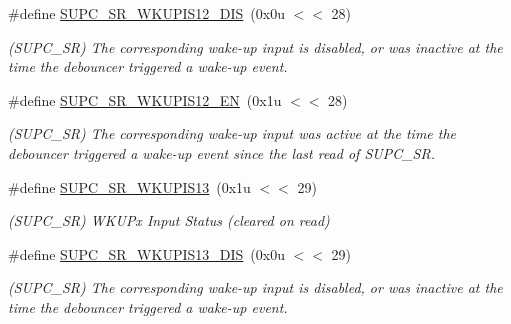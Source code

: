 \begin{DoxyCompactItemize}
\#define \mbox{\hyperlink{group__SAMV71__SUPC_ga8d50ae6062fac5694ae093e8dfc63894}{S\+U\+P\+C\+\_\+\+S\+R\+\_\+\+W\+K\+U\+P\+I\+S12\+\_\+\+D\+IS}}~(0x0u $<$$<$ 28)
\begin{DoxyCompactList}\small\item\em (S\+U\+P\+C\+\_\+\+SR) The corresponding wake-\/up input is disabled, or was inactive at the time the debouncer triggered a wake-\/up event. \end{DoxyCompactList}\item 
\mbox{\label{group__SAMV71__SUPC_ga88926dd1474bacfe6d4f9d31a5ecd487}} 
\#define \mbox{\hyperlink{group__SAMV71__SUPC_ga88926dd1474bacfe6d4f9d31a5ecd487}{S\+U\+P\+C\+\_\+\+S\+R\+\_\+\+W\+K\+U\+P\+I\+S12\+\_\+\+EN}}~(0x1u $<$$<$ 28)
\begin{DoxyCompactList}\small\item\em (S\+U\+P\+C\+\_\+\+SR) The corresponding wake-\/up input was active at the time the debouncer triggered a wake-\/up event since the last read of S\+U\+P\+C\+\_\+\+SR. \end{DoxyCompactList}\item 
\mbox{\label{group__SAMV71__SUPC_gac72338e58315c3ef88f7a9328533328e}} 
\#define \mbox{\hyperlink{group__SAMV71__SUPC_gac72338e58315c3ef88f7a9328533328e}{S\+U\+P\+C\+\_\+\+S\+R\+\_\+\+W\+K\+U\+P\+I\+S13}}~(0x1u $<$$<$ 29)
\begin{DoxyCompactList}\small\item\em (S\+U\+P\+C\+\_\+\+SR) W\+K\+U\+Px Input Status (cleared on read) \end{DoxyCompactList}\item 
\mbox{\label{group__SAMV71__SUPC_gaba99fb2dc63dc1fcd2c4a421437a0fbc}} 
\#define \mbox{\hyperlink{group__SAMV71__SUPC_gaba99fb2dc63dc1fcd2c4a421437a0fbc}{S\+U\+P\+C\+\_\+\+S\+R\+\_\+\+W\+K\+U\+P\+I\+S13\+\_\+\+D\+IS}}~(0x0u $<$$<$ 29)
\begin{DoxyCompactList}\small\item\em (S\+U\+P\+C\+\_\+\+SR) The corresponding wake-\/up input is disabled, or was inactive at the time the debouncer triggered a wake-\/up event. \end{DoxyCompactList}\item 
\mbox{\label{group__SAMV71__SUPC_gaec34ff09f82b720754bd86d17b184972}} 

\end{DoxyCompactItemize}
